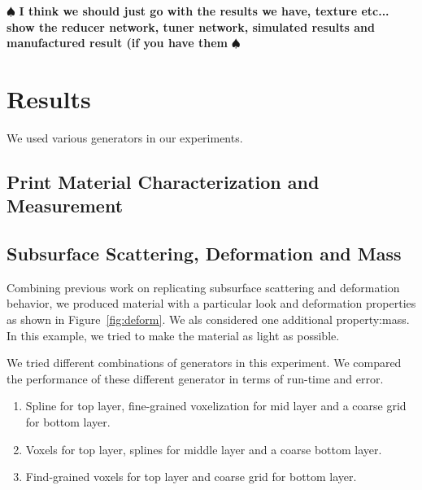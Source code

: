 \documentclass[annual]{acmsiggraph}
\newcommand{\note}[1]{\marginpar{\LARGE $\spadesuit$}
			$\spadesuit$ {\bf #1} $\spadesuit$}
\begin{document}
%
%
%
%

\note{I think we should just go with the results we have, texture etc... show the reducer network, tuner network, simulated results and manufactured result (if you have them}
\section{Results}
We used various generators in our experiments.
\subsection{Print Material Characterization and Measurement}
\subsection{Subsurface Scattering, Deformation and Mass}
Combining previous work on replicating
subsurface scattering and deformation behavior, 
we produced
material with a particular
look and deformation properties as shown in Figure~\ref{fig:deform}.
We als considered one additional property:mass. 
In this example, we
tried to make the material as light as possible.

We tried different combinations of generators in this experiment.
We compared the performance of these different generator
in terms of run-time and error.
\begin{enumerate}
\item Spline for top layer, fine-grained voxelization for mid layer
and a coarse grid for bottom layer.
\item Voxels for top layer, splines for middle layer and a coarse
bottom layer.
\item Find-grained voxels for top layer and coarse grid for bottom layer.
\end{enumerate}
\end{document}
